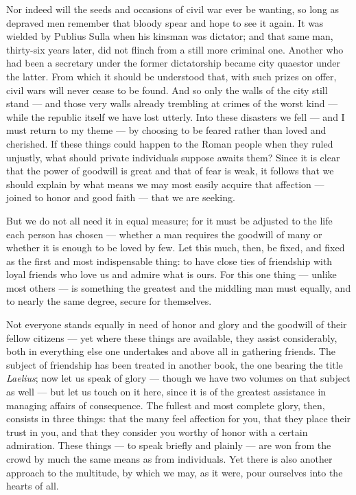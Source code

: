  Nor indeed will the seeds and occasions of civil war ever be wanting, so long as depraved men remember that bloody spear and hope to see it again. It was wielded by Publius Sulla when his kinsman was dictator; and that same man, thirty-six years later, did not flinch from a still more criminal one. Another who had been a secretary under the former dictatorship became city quaestor under the latter. From which it should be understood that, with such prizes on offer, civil wars will never cease to be found. And so only the walls of the city still stand — and those very walls already trembling at crimes of the worst kind — while the republic itself we have lost utterly. Into these disasters we fell — and I must return to my theme — by choosing to be feared rather than loved and cherished. If these things could happen to the Roman people when they ruled unjustly, what should private individuals suppose awaits them? Since it is clear that the power of goodwill is great and that of fear is weak, it follows that we should explain by what means we may most easily acquire that affection — joined to honor and good faith — that we are seeking.

 But we do not all need it in equal measure; for it must be adjusted to the life each person has chosen — whether a man requires the goodwill of many or whether it is enough to be loved by few. Let this much, then, be fixed, and fixed as the first and most indispensable thing: to have close ties of friendship with loyal friends who love us and admire what is ours. For this one thing — unlike most others — is something the greatest and the middling man must equally, and to nearly the same degree, secure for themselves.

 Not everyone stands equally in need of honor and glory and the goodwill of their fellow citizens — yet where these things are available, they assist considerably, both in everything else one undertakes and above all in gathering friends. The subject of friendship has been treated in another book, the one bearing the title \textit{Laelius}; now let us speak of glory — though we have two volumes on that subject as well — but let us touch on it here, since it is of the greatest assistance in managing affairs of consequence. The fullest and most complete glory, then, consists in three things: that the many feel affection for you, that they place their trust in you, and that they consider you worthy of honor with a certain admiration. These things — to speak briefly and plainly — are won from the crowd by much the same means as from individuals. Yet there is also another approach to the multitude, by which we may, as it were, pour ourselves into the hearts of all.

